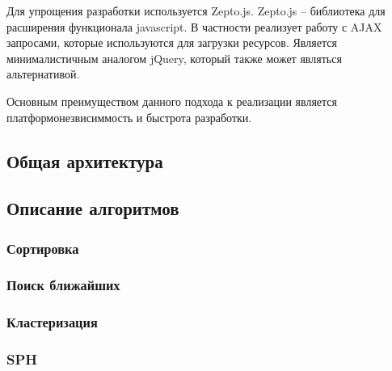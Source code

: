 Для упрощения разработки используется Zepto.js. Zepto.js -- библиотека для расширения функционала 
javascript. В частности реализует работу с AJAX запросами, которые используются для загрузки 
ресурсов. Является минималистичным аналогом jQuery, который также может являться альтернативой.

Основным преимуществом данного подхода к реализации является платформонезвисиммость и быстрота разработки.

\subsection{Общая архитектура}
\subsection{Описание алгоритмов}
\subsubsection{Сортировка}
\subsubsection{Поиск ближайших}
\subsubsection{Кластеризация}
\subsubsection{SPH}
